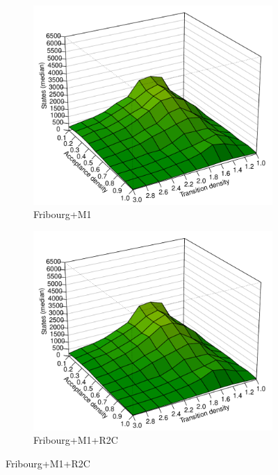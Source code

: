 \begin{figure}[ht]
\centering
  \hfill
  \begin{subfigure}[t]{\perspwidth\textwidth}
  \centering
  \includegraphics[width=\textwidth]{../results/figures/internal/goal/s.median.Fribourg+M1.pdf}
  \caption{Fribourg+M1}
  \end{subfigure}
  \hfill
  \begin{subfigure}[t]{\perspwidth\textwidth}
  \centering
  \includegraphics[width=\textwidth]{../results/figures/internal/goal/s.median.Fribourg+M1+R2C.pdf}
  \caption{Fribourg+M1+R2C}
  \end{subfigure}
  \hfill


\end{figure}
